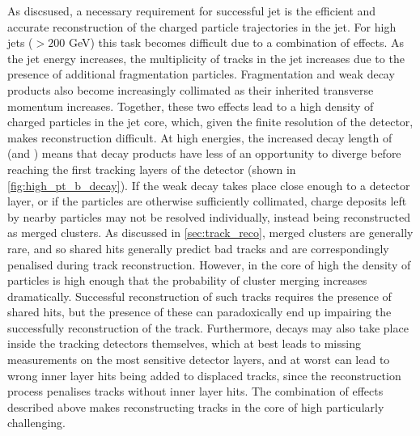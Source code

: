 As discsused, a necessary requirement for successful jet \btagging is the efficient and accurate reconstruction of the charged particle trajectories in the jet.
For high \pT jets (\pT $> 200$ GeV) this task becomes difficult due to a combination of effects.
As the jet energy increases, the multiplicity of tracks in the jet increases due to the presence of additional fragmentation particles.
Fragmentation and weak decay products also become increasingly collimated as their inherited transverse momentum increases.
Together, these two effects lead to a high density of charged particles in the jet core, which, given the finite resolution of the detector, makes reconstruction difficult.
At high energies, the increased decay length of \bhadrons (and \chadrons) means that decay products have less of an opportunity to diverge before reaching the first tracking layers of the detector (shown in \cref{fig:high_pt_b_decay}).
If the weak decay takes place close enough to a detector layer, or if the particles are otherwise sufficiently collimated, charge deposits left by nearby particles may not be resolved individually, instead being reconstructed as merged clusters.
As discussed in \cref{sec:track_reco}, merged clusters are generally rare, and so shared hits generally predict bad tracks and are correspondingly penalised during track reconstruction.
However, in the core of high \pT \bjets the density of particles is high enough that the probability of cluster merging increases dramatically.
Successful reconstruction of such tracks requires the presence of shared hits, but the presence of these can paradoxically end up impairing the successfully reconstruction of the track.
Furthermore, decays may also take place inside the tracking detectors themselves, which at best leads to missing measurements on the most sensitive detector layers, and at worst can lead to wrong inner layer hits being added to displaced tracks, since the reconstruction process penalises tracks without inner layer hits.
The combination of effects described above makes reconstructing tracks in the core of high \pT \bjets particularly challenging.


